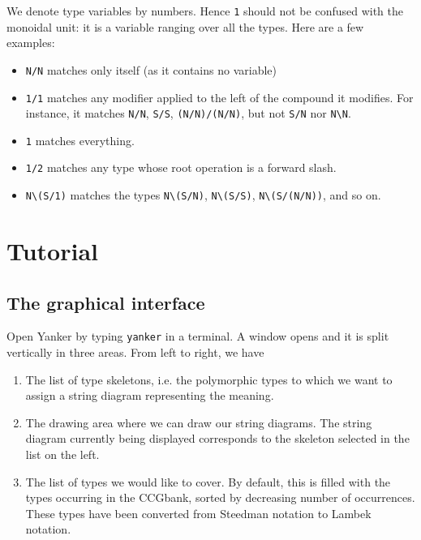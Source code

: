 \documentclass[a4paper]{article}
\begin{document}
We denote type variables by numbers. Hence \texttt{1} should not be confused
with the monoidal unit: it is a variable ranging over all the types. Here are a few examples:
\begin{itemize}
  \item \texttt{N/N} matches only itself (as it contains no variable)
  \item \texttt{1/1} matches any modifier applied to the
        left of the compound it modifies. For instance, it matches \texttt{N/N},
        \texttt{S/S}, \texttt{(N/N)/(N/N)}, but not \texttt{S/N} nor \texttt{N\textbackslash N}.
  \item \texttt{1} matches everything.
  \item \texttt{1/2} matches any type whose root operation is a forward slash.
  \item \texttt{N\textbackslash (S/1)} matches the types \texttt{N\textbackslash(S/N)},
      \texttt{N\textbackslash(S/S)}, \texttt{N\textbackslash(S/(N/N))}, and so on.
\end{itemize}

\section{Tutorial}

\subsection{The graphical interface}

Open Yanker by typing \texttt{yanker} in a terminal. A window opens and it is split vertically
in three areas. From left to right, we have
\begin{enumerate}
  \item The list of type skeletons, i.e. the polymorphic types to which we want to assign
       a string diagram representing the meaning.
  \item The drawing area where we can draw our string diagrams. The string diagram
        currently being displayed corresponds to the skeleton selected in the list on the
        left.
  \item The list of types we would like to cover. By default, this is filled with the
        types occurring in the CCGbank, sorted by decreasing number of occurrences. These
        types have been converted from Steedman notation to Lambek notation.
\end{enumerate}
\end{document}

